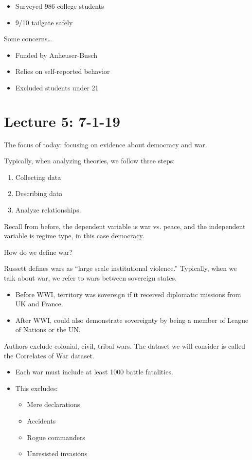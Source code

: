 \documentclass{article}
\begin{document}
\begin{itemize}
  \item Surveyed 986 college students
  \item 9/10 tailgate safely
\end{itemize}

Some concerns\ldots

\begin{itemize}
  \item Funded by Anheuser-Busch
  \item Relies on self-reported behavior
  \item Excluded students under 21
\end{itemize}

\section{Lecture 5: 7-1-19}

The focus of today: focusing on evidence about democracy and war.

Typically, when analyzing theories, we follow three steps:

\begin{enumerate}
  \item Collecting data
  \item Describing data
  \item Analyze relationships.
\end{enumerate}

Recall from before, the dependent variable is war vs. peace, and the independent variable is regime type, in this case democracy.

How do we define war?

Russett defines wars as ``large scale institutional violence.''  Typically, when we talk about war, we refer to wars between sovereign states.

\begin{itemize}
  \item Before WWI, territory was sovereign if it received diplomatic missions from UK and France.
  \item After WWI, could also demonstrate sovereignty by being a member of League of Nations or the UN.
\end{itemize}

Authors exclude colonial, civil, tribal wars. The dataset we will consider is called the Correlates of War dataset.  

\begin{itemize}
  \item Each war must include at least 1000 battle fatalities.  
  \item This excludes:
    \begin{itemize}
      \item Mere declarations
      \item Accidents
      \item Rogue commanders
      \item Unresisted invasions
    \end{itemize}
\end{itemize}
\end{document}
